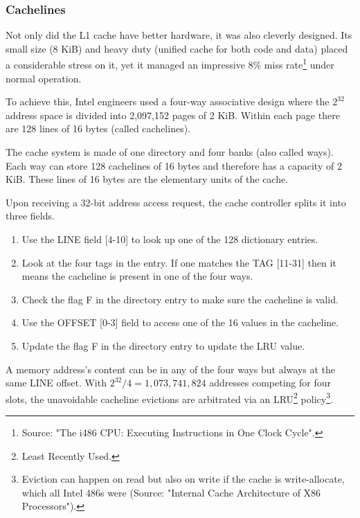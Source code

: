 \subsubsection{Cachelines}
Not only did the L1 cache have better hardware, it was also cleverly designed. Its small size (8 KiB) and heavy duty (unified cache for both code and data) placed a considerable stress on it, yet it managed an impressive 8\% miss rate\footnote{Source: "The i486 CPU: Executing Instructions in One Clock Cycle".} under normal operation.\\
\par
To achieve this, Intel engineers used a four-way associative design where the $2^{32}$ address space is divided into 2,097,152 pages of 2 KiB. Within each page there are 128 lines of 16 bytes (called cachelines).\\
\par
{}
\par
The cache system is made of one directory and four banks (also called ways). Each way can store 128 cachelines of 16 bytes and therefore has a capacity of 2 KiB. These lines of 16 bytes are the elementary units of the cache.\\
\par
Upon receiving a 32-bit address access request, the cache controller splits it into three fields.
\begin{enumerate}
\item Use the LINE field [4-10] to look up one of the 128 dictionary entries.
\item Look at the four tags in the entry. If one matches the TAG [11-31] then it means the cacheline is present in one of the four ways.
\item Check the flag F in the directory entry to make sure the cacheline is valid.
\item Use the OFFSET [0-3] field to access one of the 16 values in the cacheline.
\item Update the flag F in the directory entry to update the LRU value.
\end{enumerate}
\par
A memory address's content can be in any of the four ways but always at the same LINE offset. With $2^{32} / 4 = 1,073,741,824$ addresses competing for four slots, the unavoidable cacheline evictions are arbitrated via an LRU\footnote{Least Recently Used.} policy\footnote{Eviction can happen on read but also on write if the cache is write-allocate, which all Intel 486s were (Source: "Internal Cache Architecture of X86 Processors").}.\\
